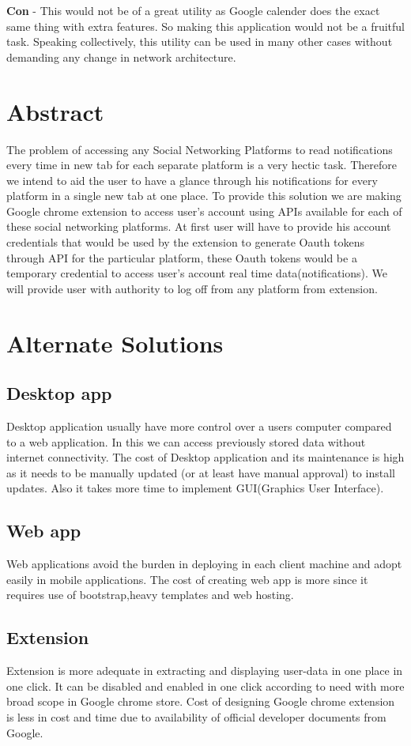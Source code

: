 \documentclass[12pt]{article}
\begin{document}
	\textbf{Con} - This would not be of a great utility as Google calender does the exact same thing with extra features. So making this application would not be a fruitful task.
	Speaking collectively, this utility can be used in many other cases without demanding any change in network architecture.
    
	\section{Abstract}
    The problem of accessing any Social Networking Platforms to read notifications every time in new tab for each separate platform is a very hectic task. Therefore we intend to aid the user to have a glance through his notifications for every platform in a single new tab at one place. To provide this solution we are making Google chrome extension to access user's account using APIs available for each of these social networking platforms. At first user will have to provide his account credentials that would be used by the extension to generate Oauth tokens through API for the particular platform, these Oauth tokens would be a temporary credential to access user's account real time data(notifications). We will provide user with authority to log off from any platform from extension.
	    
	    
	\section{Alternate Solutions}
	\subsection{Desktop app}
    Desktop application usually have more control over a users computer compared to a web application. In this we can access previously stored data without internet connectivity.
        The cost of Desktop application and its maintenance is high as it needs to be manually updated (or at least have manual approval) to install updates.
        Also it takes more time to implement GUI(Graphics User Interface).  
	\subsection{Web app}
	Web applications avoid the burden in deploying in each client machine and adopt easily in mobile applications. The cost of creating web app is more since it requires use of bootstrap,heavy templates and web hosting.
	\subsection{Extension}
	Extension is more adequate in extracting and displaying user-data in one place in one click. It can be disabled and enabled in one click according to need with more broad scope in Google chrome store.
	Cost of designing Google chrome extension is less in cost and time due to availability of official developer documents from Google.
	
\end{document}
